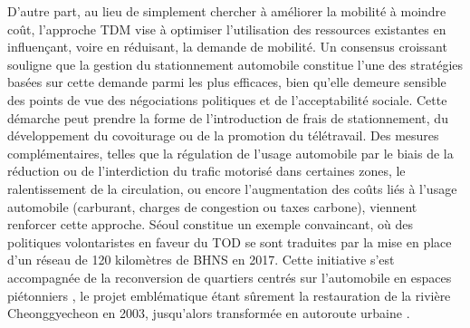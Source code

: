 \begin{refsegment}
\begin{customitemize}
\item D’autre part, au lieu de simplement chercher à améliorer la mobilité à moindre coût, l’approche \acrshort{TDM} vise à optimiser l’utilisation des ressources existantes en influençant, voire en réduisant, la demande de mobilité. Un consensus croissant souligne que la gestion du stationnement automobile constitue l’une des stratégies basées sur cette demande parmi les plus efficaces, bien qu’elle demeure sensible des points de vue des négociations politiques et de l'acceptabilité sociale. Cette démarche peut prendre la forme de l'introduction de frais de stationnement, du développement du covoiturage ou de la promotion du télétravail. Des mesures complémentaires, telles que la régulation de l’usage automobile par le biais de la réduction ou de l’interdiction du trafic motorisé dans certaines zones, le ralentissement de la circulation, ou encore l’augmentation des coûts liés à l’usage automobile (carburant, charges de congestion ou taxes carbone), viennent renforcer cette approche. Séoul constitue un exemple convaincant, où des politiques volontaristes en faveur du \acrshort{TOD} se sont traduites par la mise en place d’un réseau de 120 kilomètres de \acrshort{BHNS} en 2017. Cette initiative s’est accompagnée de la reconversion de quartiers centrés sur l’automobile en espaces piétonniers \textcolor{blue}{\autocite[6]{prayogi_bus_2018}}, le projet emblématique étant sûrement la restauration de la rivière Cheonggyecheon en 2003, jusqu'alors transformée en autoroute urbaine \textcolor{blue}{\autocite[]{shin_cheongyecheon_2013}}.
    \end{customitemize}%


\end{refsegment}
